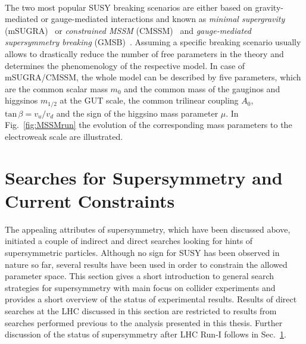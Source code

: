 \\
The two most popular SUSY breaking scenarios are either based on gravity-mediated or gauge-mediated interactions and known as \textit{minimal supergravity} (mSUGRA)~\cite{Chamseddine:1982jx, AlvarezGaume:1983gj} or \textit{constrained MSSM} (CMSSM)~\cite{Kane:1993td, Baer:2002gm} and \textit{gauge-mediated supersymmetry breaking} (GMSB)~\cite{Dine:1981gu, AlvarezGaume:1981wy}. Assuming a specific breaking scenario usually allows to drastically reduce the number of free parameters in the theory and determines the phenomenology of the respective model. In case of mSUGRA/CMSSM, the whole model can be described by five parameters, which are the common scalar mass $m_0$ and the common mass of the gauginos and higgsinos $m_{1/2}$ at the GUT scale, the common trilinear coupling $A_0$, $\mathrm{tan} \, \beta = v_u/v_d$ and the sign of the higgsino mass parameter $\mu$. In Fig.~\ref{fig:MSSMrun} the evolution of the corresponding mass parameters to the electroweak scale are illustrated.  

\section{Searches for Supersymmetry and Current Constraints}
\label{sec:susy_status}
The appealing attributes of supersymmetry, which have been discussed above, initiated a couple of indirect and direct searches looking for hints of supersymmetric particles. Although no sign for SUSY has been observed in nature so far, several results have been used in order to constrain the allowed parameter space. This section gives a short introduction to general search strategies for supersymmetry with main focus on collider experiments and provides a short overview of the status of experimental results. Results of direct searches at the LHC discussed in this section are restricted to results from searches performed previous to the analysis presented in this thesis. Further discussion of the status of supersymmetry after LHC Run-I follows in Sec.~\ref{sec:susy_status}.  

